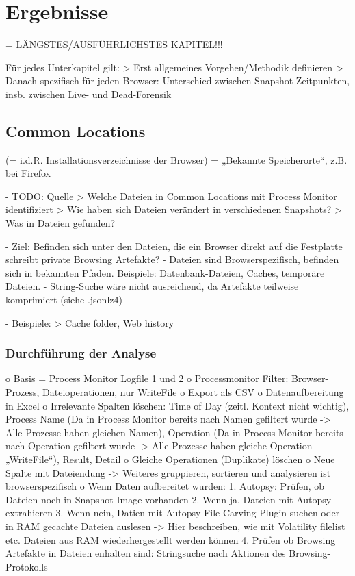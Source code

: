 \chapter{Ergebnisse}

= LÄNGSTES/AUSFÜHRLICHSTES KAPITEL!!!

Für jedes Unterkapitel gilt: 
> Erst allgemeines Vorgehen/Methodik definieren
> Danach spezifisch für jeden Browser: Unterschied zwischen Snapshot-Zeitpunkten, insb. zwischen Live- und Dead-Forensik


\section{Common Locations}

(= i.d.R. Installationsverzeichnisse der Browser) = „Bekannte Speicherorte“, z.B. bei Firefox   

- TODO: Quelle
> Welche Dateien in Common Locations mit Process Monitor identifiziert
> Wie haben sich Dateien verändert in verschiedenen Snapshots?
> Was in Dateien gefunden?


-	Ziel: Befinden sich unter den Dateien, die ein Browser direkt auf die Festplatte schreibt private Browsing Artefakte?
-	Dateien sind Browserspezifisch, befinden sich in bekannten Pfaden. Beispiele: Datenbank-Dateien, Caches, temporäre Dateien.
-	String-Suche wäre nicht ausreichend, da Artefakte teilweise komprimiert (siehe .jsonlz4)

- Beispiele:
	> Cache folder, Web history \cite{Montasari.2015}

\subsection*{Durchführung der Analyse}

o	Basis = Process Monitor Logfile 1 und 2
o	Processmonitor Filter: Browser-Prozess, Dateioperationen, nur WriteFile
o	Export als CSV
o	Datenaufbereitung in Excel
	o	Irrelevante Spalten löschen: Time of Day (zeitl. Kontext nicht wichtig), Process Name (Da in Process Monitor bereits nach Namen gefiltert wurde -> Alle Prozesse haben gleichen Namen), Operation (Da in Process Monitor bereits nach Operation gefiltert wurde -> Alle Prozesse haben gleiche Operation „WriteFile“), Result, Detail
	o	Gleiche Operationen (Duplikate) löschen
	o	Neue Spalte mit Dateiendung
		-> Weiteres gruppieren, sortieren und analysieren ist browserspezifisch
	o	Wenn Daten aufbereitet wurden: 
		1.	Autopsy: Prüfen, ob Dateien noch in Snapshot Image vorhanden
		2.	Wenn ja, Dateien mit Autopsy extrahieren 
		3.	Wenn nein, Datien mit Autopsy File Carving Plugin suchen oder in RAM gecachte Dateien auslesen 
			-> Hier beschreiben, wie mit Volatility filelist etc. Dateien aus RAM wiederhergestellt werden können
		4.	Prüfen ob Browsing Artefakte in Dateien enhalten sind: Stringsuche nach Aktionen des Browsing-Protokolls



